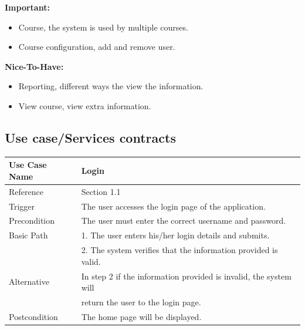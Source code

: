 \documentclass[10pt,a4paper]{article}
\begin{document}
 
 
\textbf{Important:}
\begin{itemize}
	\item Course, the system is used by multiple courses.
 \end{itemize}
\begin{itemize}
	\item Course configuration, add and remove user.
 \end{itemize}

\textbf{Nice-To-Have:}
 \begin{itemize}
	\item Reporting, different ways the view the information.
 \end{itemize}
 \begin{itemize}
	\item View course, view extra information.
 \end{itemize}


\subsection{Use case/Services contracts}
 \begin{tabular}{|l|l|}\hline
                        Use Case Name   & Login \\\hline
                        Reference & Section 1.1\\\hline
                        Trigger & The user accesses the login page of the application.\\\hline
                        Precondition & The user must enter the correct username and password.\\\hline
                        Basic Path & 1.	The user enters his/her login details and submits. 
                        \\\linebreak &
                        2.	 The system verifies that the information provided is valid.
                        \\\hline
                        Alternative & In step 2 if the information provided is invalid, the system will
                        \\\linebreak & return the user to the login page.\\\hline
                        Postcondition & The home page will be displayed.\\\hline
                \end{tabular} 
                
\end{document}
